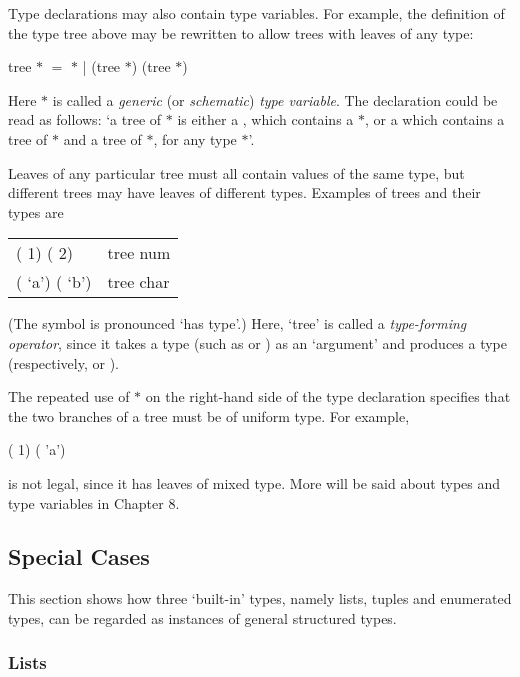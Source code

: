 Type declarations may also contain type variables. For example, the definition of the type tree above may be rewritten to allow trees with leaves of any type:
\begin{mlcoded}
    tree $*$ \hastype$=$  $*$ |  (tree $*$) (tree $*$)
\end{mlcoded}
Here $*$ is called a \textit{generic} (or \textit{schematic}) \textit{type variable}. The declaration could be read as follows: `a tree of $*$ is either a , which contains a $*$, or a  which contains a tree of $*$ and a tree of $*$, for any type $*$'.

Leaves of any particular tree must all contain values of the same type, but different trees may have leaves of different types. Examples of trees and their types are
\begin{mlcoded}
    \begin{tabular}{ll}

    \ml{BRANCH} (\ml{LEAF} 1) (\ml{LEAF} 2)
    &\hastype tree num\\
    \ml{BRANCH} (\ml{LEAF} `a') (\ml{LEAF} `b')
    &\hastype tree char

    \end{tabular}
\end{mlcoded}
(The symbol \hastype is pronounced `has type'.) Here, `tree' is called a \textit{type-forming operator}, since it takes a type (such as  or ) as an `argument' and produces a type (respectively,  or ).

The repeated use of $*$ on the right-hand side of the type declaration specifies that the two branches of a tree must be of uniform type. For example,
\begin{mlcoded}
     ( 1) ( 'a')
\end{mlcoded}
is not legal, since it has leaves of mixed type. More will be said about types and type variables in Chapter 8.

\subsection{Special Cases}

This section shows how three `built-in' types, namely lists, tuples and enumerated types, can be regarded as instances of general structured types.

\subsubsection{Lists}


